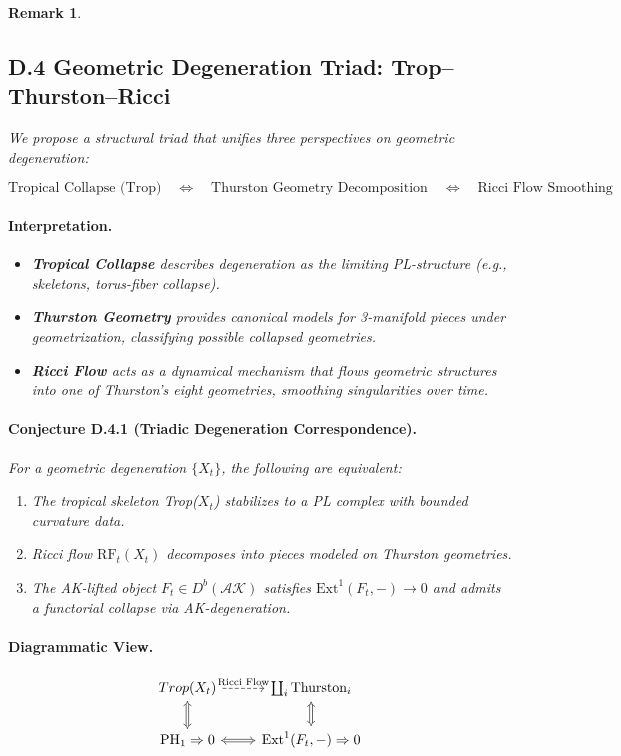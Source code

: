 \documentclass[11pt]{article}
\newtheorem{remark}[theorem]{Remark}
\begin{document}
\begin{remark}
\subsection*{D.4 Geometric Degeneration Triad: Trop–Thurston–Ricci}

We propose a structural triad that unifies three perspectives on geometric degeneration:

\[
\text{Tropical Collapse (Trop)} \quad \Leftrightarrow \quad \text{Thurston Geometry Decomposition} \quad \Leftrightarrow \quad \text{Ricci Flow Smoothing}
\]

\paragraph{Interpretation.}
\begin{itemize}
  \item \textbf{Tropical Collapse} describes degeneration as the limiting PL-structure (e.g., skeletons, torus-fiber collapse).
  \item \textbf{Thurston Geometry} provides canonical models for 3-manifold pieces under geometrization, classifying possible collapsed geometries.
  \item \textbf{Ricci Flow} acts as a dynamical mechanism that flows geometric structures into one of Thurston’s eight geometries, smoothing singularities over time.
\end{itemize}

\paragraph{Conjecture D.4.1 (Triadic Degeneration Correspondence).}
For a geometric degeneration \( \{X_t\} \), the following are equivalent:

\begin{enumerate}
  \item The tropical skeleton Trop(\(X_t\)) stabilizes to a PL complex with bounded curvature data.
  \item Ricci flow \( \mathrm{RF}_t(X_t) \) decomposes into pieces modeled on Thurston geometries.
  \item The AK-lifted object \( F_t \in D^b(\mathcal{AK}) \) satisfies \( \mathrm{Ext}^1(F_t, -) \to 0 \) and admits a functorial collapse via AK-degeneration.
\end{enumerate}

\paragraph{Diagrammatic View.}
\[
\begin{tikzcd}
Trop(X_t) \arrow[d, Leftrightarrow] \arrow[r, dashed, "\text{Ricci Flow}"] & \coprod_i \text{Thurston}_i \arrow[d, Leftrightarrow] \\
\mathrm{PH}_1 \Rightarrow 0 \arrow[r, Leftrightarrow] & \mathrm{Ext}^1(F_t, -) \Rightarrow 0
\end{tikzcd}
\]


\end{remark}
\end{document}
